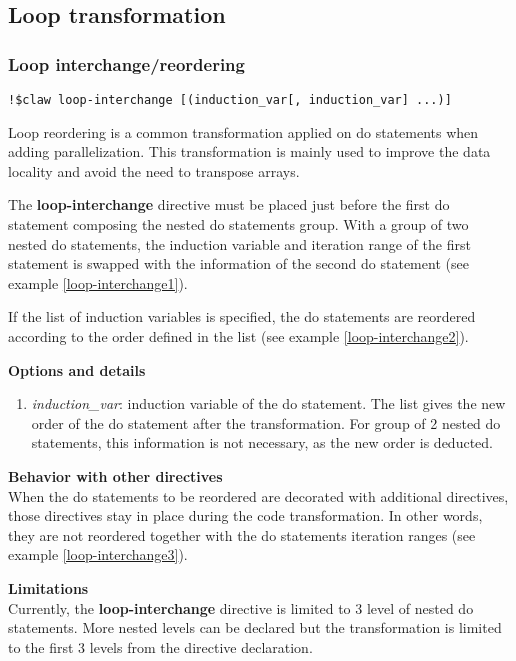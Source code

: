 \subsection{Loop transformation}

%
%
\subsubsection{Loop interchange/reordering}
\begin{lstlisting}
!$claw loop-interchange [(induction_var[, induction_var] ...)]
\end{lstlisting}

Loop reordering is a common transformation applied on do statements when adding
parallelization. This transformation is mainly used to improve the data locality
and avoid the need to transpose arrays.

The \textbf{loop-interchange} directive must be placed just before the first do
statement composing the nested do statements group. With a group of two nested
do statements, the induction variable and iteration range of the first statement
is swapped with the information of the second do statement (see example
\ref{loop-interchange1}).

If the list of induction variables is specified, the do statements are reordered
according to the order defined in the list (see example
\ref{loop-interchange2}).

\textbf{Options and details}
\begin{enumerate}
\item \textit{induction\_var}: induction variable of the do statement. The list
gives the new order of the do statement after the transformation. For group of
2 nested do statements, this information is not necessary, as the new order is
deducted.
\end{enumerate}

\textbf{Behavior with other directives}\\
When the do statements to be reordered are decorated with additional directives,
those directives stay in place during the code transformation. In other words,
they are not reordered together with the do statements iteration ranges
(see example \ref{loop-interchange3}).

\textbf{Limitations}\\
Currently, the \textbf{loop-interchange} directive is limited to 3 level of
nested do statements. More nested levels can be declared but the transformation
is limited to the first 3 levels from the directive declaration.

